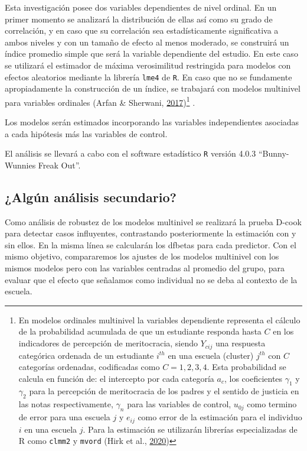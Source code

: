 \documentclass[
  12pt,
]{article}
\begin{document}
Esta investigación posee dos variables dependientes de nivel ordinal. En
un primer momento se analizará la distribución de ellas así como su
grado de correlación, y en caso que su correlación sea estadísticamente
significativa a ambos niveles y con un tamaño de efecto al menos
moderado, se construirá un índice promedio simple que será la variable
dependiente del estudio. En este caso se utilizará el estimador de
máxima verosimilitud restringida para modelos con efectos aleatorios
mediante la librería \texttt{lme4} de \texttt{R}. En caso que no se
fundamente apropiadamente la construcción de un índice, se trabajará con
modelos multinivel para variables ordinales (Arfan \& Sherwani,
\protect\hyperlink{ref-arfan_Ordinal_2017}{2017})\footnote{En modelos
  ordinales multinivel la variables dependiente representa el cálculo de
  la probabilidad acumulada de que un estudiante responda hasta \(C\) en
  los indicadores de percepción de meritocracia, siendo \(Y_{cij}\) una
  respuesta categórica ordenada de un estudiante \(i^{th}\) en una
  escuela (cluster) \(j^{th}\) con \(C\) categorías ordenadas,
  codificadas como \(C = 1,2,3,4\). Esta probabilidad se calcula en
  función de: el intercepto por cada categoría \(a_c\), los coeficientes
  \(\gamma_1\) y \(\gamma_2\) para la percepción de meritocracia de los
  padres y el sentido de justicia en las notas respectivamente,
  \(\gamma_n\) para las variables de control, \(u_{0j}\) como termino de
  error para una escuela \(j\) y \(e_{ij}\) como error de la estimación
  para el individuo \(i\) en una escuela \(j\). Para la estimación se
  utilizarán librerías especializadas de R como \texttt{clmm2} y
  \texttt{mvord} (Hirk et al.,
  \protect\hyperlink{ref-hirk_mvord_2020}{2020})} .

Los modelos serán estimados incorporando las variables independientes
asociadas a cada hipótesis más las variables de control.

El análisis se llevará a cabo con el software estadístico \texttt{R}
versión 4.0.3 ``Bunny-Wunnies Freak Out''.

\hypertarget{alguxfan-anuxe1lisis-secundario}{%
\subsection{¿Algún análisis
secundario?}\label{alguxfan-anuxe1lisis-secundario}}

Como análisis de robustez de los modelos multinivel se realizará la
prueba D-cook para detectar casos influyentes, contrastando
posteriormente la estimación con y sin ellos. En la misma línea se
calcularán los dfbetas para cada predictor. Con el mismo objetivo,
compararemos los ajustes de los modelos multinivel con los mismos
modelos pero con las variables centradas al promedio del grupo, para
evaluar que el efecto que señalamos como individual no se deba al
contexto de la escuela.
\end{document}
